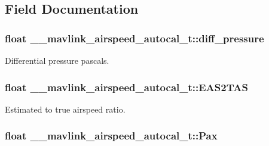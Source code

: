 \subsection{Field Documentation}
\hypertarget{struct____mavlink__airspeed__autocal__t_a1944a4411ee40af06eb77789b5c38555}{
\subsubsection[{diff\+\_\+pressure}]{\setlength{\rightskip}{0pt plus 5cm}float \+\_\+\+\_\+mavlink\+\_\+airspeed\+\_\+autocal\+\_\+t\+::diff\+\_\+pressure}}\label{struct____mavlink__airspeed__autocal__t_a1944a4411ee40af06eb77789b5c38555}


Differential pressure pascals. 

\hypertarget{struct____mavlink__airspeed__autocal__t_a7342420cf14c60e0dcc928f76cbcb368}{
\subsubsection[{E\+A\+S2\+T\+A\+S}]{\setlength{\rightskip}{0pt plus 5cm}float \+\_\+\+\_\+mavlink\+\_\+airspeed\+\_\+autocal\+\_\+t\+::\+E\+A\+S2\+T\+A\+S}}\label{struct____mavlink__airspeed__autocal__t_a7342420cf14c60e0dcc928f76cbcb368}


Estimated to true airspeed ratio. 

\hypertarget{struct____mavlink__airspeed__autocal__t_a22585dd9a08666ba39744a60a722a067}{
\subsubsection[{Pax}]{\setlength{\rightskip}{0pt plus 5cm}float \+\_\+\+\_\+mavlink\+\_\+airspeed\+\_\+autocal\+\_\+t\+::\+Pax}}\label{struct____mavlink__airspeed__autocal__t_a22585dd9a08666ba39744a60a722a067}


